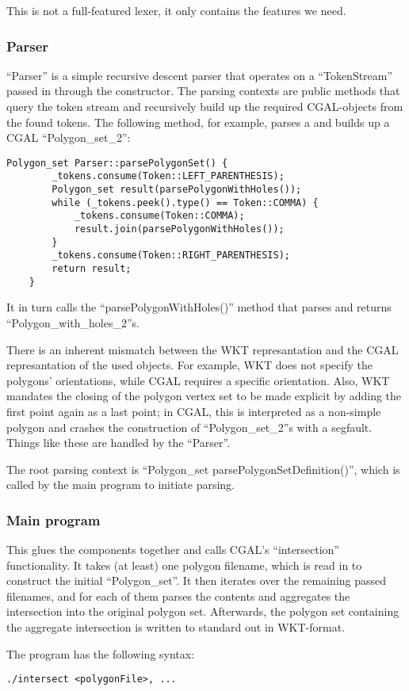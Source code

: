 This is not a full-featured lexer, it only contains the features we need.

\subsubsection{Parser}

``Parser'' is a simple recursive descent parser that operates on a ``TokenStream'' passed in through the constructor.
The parsing contexts are public methods that query the token stream and recursively build up the required CGAL-objects
from the found tokens.
The following method, for example, parses a and builds up a CGAL ``Polygon\_set\_2'':

\begin{lstlisting}[numbers=none]
    Polygon_set Parser::parsePolygonSet() {
        _tokens.consume(Token::LEFT_PARENTHESIS);
        Polygon_set result(parsePolygonWithHoles());
        while (_tokens.peek().type() == Token::COMMA) {
            _tokens.consume(Token::COMMA);
            result.join(parsePolygonWithHoles());
        }
        _tokens.consume(Token::RIGHT_PARENTHESIS);
        return result;
    }
\end{lstlisting}
    
It in turn calls the ``parsePolygonWithHoles()'' method that parses and returns ``Polygon\_with\_holes\_2''s.

There is an inherent mismatch between the WKT represantation and the CGAL represantation of the used objects.
For example, WKT does not specify the polygons' orientations, while CGAL requires a specific orientation.
Also, WKT mandates the closing of the polygon vertex set to be made explicit by adding the first point again as
a last point; in CGAL, this is interpreted as a non-simple polygon and crashes the construction of
``Polygon\_set\_2''s with a segfault. Things like these are handled by the ``Parser''.

The root parsing context is ``Polygon\_set parsePolygonSetDefinition()'', which is called by the main program
to initiate parsing.

\subsubsection{Main program}

This glues the components together and calls CGAL's ``intersection'' functionality.
It takes (at least) one polygon filename, which is read in to construct the initial ``Polygon\_set''. It then
iterates over the remaining passed filenames, and for each of them parses the contents and aggregates the intersection
into the original polygon set. Afterwards, the polygon set containing the aggregate intersection is written to
standard out in WKT-format.

The program has the following syntax:

\begin{lstlisting}[numbers=none]
./intersect <polygonFile>, ...
\end{lstlisting}
